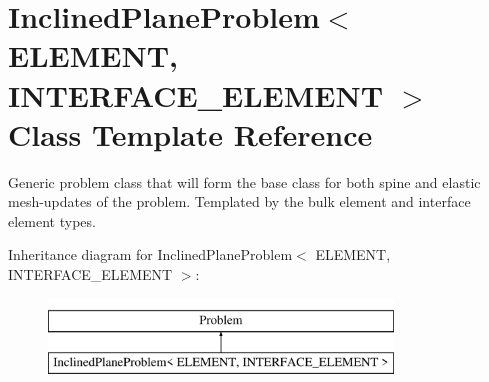 \hypertarget{classInclinedPlaneProblem}{}\section{Inclined\+Plane\+Problem$<$ E\+L\+E\+M\+E\+NT, I\+N\+T\+E\+R\+F\+A\+C\+E\+\_\+\+E\+L\+E\+M\+E\+NT $>$ Class Template Reference}
\label{classInclinedPlaneProblem}


Generic problem class that will form the base class for both spine and elastic mesh-\/updates of the problem. Templated by the bulk element and interface element types.  


Inheritance diagram for Inclined\+Plane\+Problem$<$ E\+L\+E\+M\+E\+NT, I\+N\+T\+E\+R\+F\+A\+C\+E\+\_\+\+E\+L\+E\+M\+E\+NT $>$\+:\begin{figure}[H]
\begin{center}
\leavevmode
\includegraphics[height=2.000000cm]{classInclinedPlaneProblem}
\end{center}
\end{figure}
